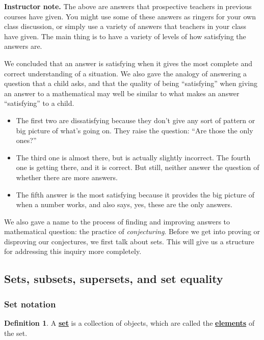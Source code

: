 \documentclass[11pt]{article}
\newcommand\smallnote[1]
	{\begin{mdframed}\raggedright  {\bf Instructor note.} {#1} \end{mdframed}}
\renewcommand\emph[1]{\underline{\bf{#1}}} %
\theoremstyle{definition}
\newtheorem{definition}[theorem]{Definition}
\begin{document}
\smallnote{The above are answers that prospective teachers in previous courses have given. You might use some of these answers as ringers for your own class discussion, or simply use a variety of answers that teachers in your class have given. The main thing is to have a variety of levels of how satisfying the answers are.}

We concluded that an answer is satisfying when it gives the most complete and correct understanding of a situation. We also gave the analogy of answering a question that a child asks, and that the quality of being ``satisfying'' when giving an answer to a mathematical may well be similar to what makes an answer ``satisfying'' to a child. 

\begin{itemize}
\item The first two are dissatisfying because they don't give any sort of pattern or big picture of what's going on. They
raise the question: ``Are those the only ones?'' 
\item The third one is almost there, but is actually slightly incorrect. The fourth one is getting there, and it is correct. But still, neither answer the question of whether there are more answers.
\item The fifth answer is the most satisfying because it provides the big picture of when a number works, and also says, yes, these are the only answers.
\end{itemize}

We also gave a name to the process of finding and improving answers to mathematical question: the practice of {\it conjecturing}. Before we get into proving or disproving our conjectures, we first talk about sets. This will give us a structure for addressing this inquiry more completely.

\vspace*{8pt}
\subsection{Sets, subsets, supersets, and set equality}

\subsubsection{Set notation}\label{s: set notation}


\vspace*{8pt}

\begin{definition}\label{definition: set} A \emph{set} is a collection of objects, which are called the \emph{elements} of the set.
\end{definition}
\end{document}
